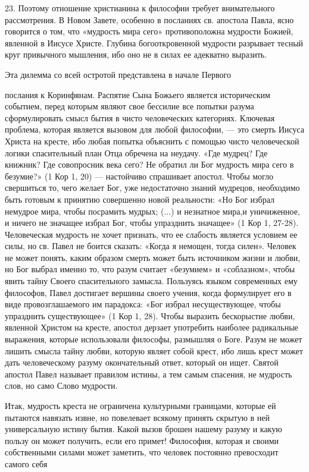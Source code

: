 \documentclass[a5paper,10pt]{article}
\begin{document}
23. Поэтому отношение христианина к философии требует внимательного
рассмотрения. В Новом Завете, особенно в посланиях св. апостола Павла, ясно
говорится о том, что «мудрость мира сего» противоположна мудрости Божией,
явленной в Иисусе Христе. Глубина богооткровенной мудрости разрывает тесный
круг привычного мышления, ибо оно не в силах ее адекватно выразить.

Эта дилемма со всей остротой представлена в начале Первого

послания к Коринфянам. Распятие Сына Божьего является историческим событием,
перед которым являют свое бессилие все попытки разума сформулировать смысл
бытия в чисто человеческих категориях. Ключевая проблема, которая является
вызовом для любой философии, — это смерть Иисуса Христа на кресте, ибо любая
попытка объяснить с помощью чисто человеческой логики спасительный план Отца
обречена на неудачу. «Где мудрец? Где книжник? Где совопросник века сего? Не
обратил ли Бог мудрость мира сего в безумие?» (1 Кор 1, 20) — настойчиво
спрашивает апостол. Чтобы могло свершиться то, чего желает Бог, уже
недостаточно знаний мудрецов, необходимо быть готовым к принятию совершенно
новой реальности: «Но Бог избрал немудрое мира, чтобы посрамить мудрых; (...) и
незнатное мира,и уничиженное, и ничего не значащее избрал Бог, чтобы упразднить
значащее» (1 Кор 1, 27-28). Человеческая мудрость не хочет признать, что ее
слабость является условием ее силы, но св. Павел не боится сказать: «Когда я
немощен, тогда силен». Человек не может понять, каким образом смерть может быть
источником жизни и любви, но Бог выбрал именно то, что разум считает «безумием»
и «соблазном», чтобы явить тайну Своего спасительного замысла. Пользуясь языком
современных ему философов, Павел достигает вершины своего учения, когда
формулирует его в виде провозглашаемого им парадокса: «Бог избрал
несуществующее, чтобы упразднить существующее» (1 Кор 1, 28). Чтобы выразить
бескорыстие любви, явленной Христом на кресте, апостол дерзает употребить
наиболее радикальные выражения, которые использовали философы, размышляя о
Боге. Разум не может лишить смысла тайну любви, которую являет собой крест, ибо
лишь крест может дать человеческому разуму окончательный ответ, который он
ищет. Святой апостол Павел называет правилом истины, а тем самым спасения, не
мудрость слов, но само Слово мудрости.

Итак, мудрость креста не ограничена культурными границами, которые ей пытаются
навязать извне, но повелевает всякому принять скрытую в ней универсальную
истину бытия. Какой вызов брошен нашему разуму и какую пользу он может
получить, если его примет! Философия, которая и своими собственными силами
может заметить, что человек постоянно превосходит самого себя
\end{document}
